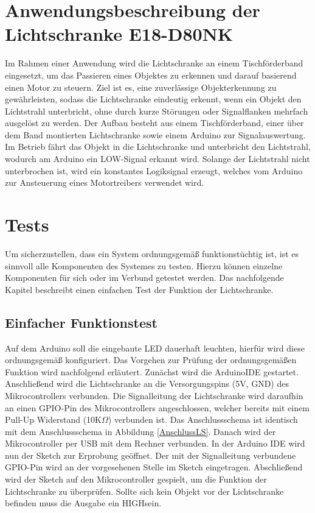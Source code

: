 

\section{Anwendungsbeschreibung der Lichtschranke E18-D80NK}

Im Rahmen einer Anwendung wird die Lichtschranke an einem Tischförderband eingesetzt, um das Passieren eines Objektes zu erkennen und darauf basierend einen Motor zu steuern. Ziel ist es, eine zuverlässige Objekterkennung zu gewährleisten, sodass die Lichtschranke eindeutig erkennt, wenn ein Objekt den Lichtstrahl  unterbricht, ohne durch kurze Störungen oder Signalflanken mehrfach ausgelöst zu werden.
Der Aufbau besteht aus einem Tischförderband, einer über dem Band montierten Lichtschranke sowie einem Arduino zur Signalauswertung. 
Im Betrieb fährt das Objekt in  die Lichtschranke und unterbricht den Lichtstrahl, wodurch am Arduino ein LOW-Signal erkannt wird. Solange der Lichtstrahl nicht unterbrochen ist, wird ein konstantes Logiksignal erzeugt, welches vom Arduino zur Ansteuerung eines Motortreibers verwendet wird.

\section{Tests}
Um sicherzustellen, dass ein System ordnungsgemäß funktionstüchtig ist, ist es sinnvoll alle Komponenten des Systemes zu testen. 
Hierzu können einzelne Komponenten für sich oder im Verbund getestet werden. Das nachfolgende Kapitel beschreibt einen einfachen Test der Funktion der Lichtschranke.
\subsection{Einfacher Funktionstest}
Auf dem Arduino soll die eingebaute LED dauerhaft leuchten, hierfür wird diese ordnungsgemäß konfiguriert. Das Vorgehen zur Prüfung der ordnungsgemäßen Funktion wird nachfolgend erläutert.
Zunächst wird die ArduinoIDE gestartet. Anschließend wird die Lichtschranke an die Versorgungspins (5V, GND) des Mikrocontrollers verbunden. Die Signalleitung der Lichtschranke wird daraufhin an einen GPIO-Pin des Mikrocontrollers angeschlossen, welcher bereits mit einem Pull-Up Widerstand (10K$\Omega$) verbunden ist. Das Anschlussschema ist identisch mit dem Anschlussschema in Abbildung \ref{AnschlussLS}.
 Danach wird der Mikrocontroller per USB mit dem Rechner verbunden. In der Arduino IDE wird nun der Sketch zur Erprobung geöffnet. Der mit der Signalleitung verbundene GPIO-Pin wird an der vorgesehenen Stelle im Sketch eingetragen. Abschließend wird der Sketch auf den Mikrocontroller gespielt, um die Funktion der Lichtschranke zu überprüfen. Sollte sich kein Objekt vor der Lichtschranke befinden muss die Ausgabe ein \glqq HIGH\grqq \space sein. 
